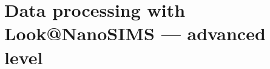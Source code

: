 \documentclass[a4paper, 11pt]{article}
\newcommand{\lans}[1]{{\color{magenta}#1}}
\newcommand\addon[1]{-- {\small #1}}
\begin{document}

\section{Data processing with Look@NanoSIMS --- advanced level}
\label{sec:level3}


\end{document}
